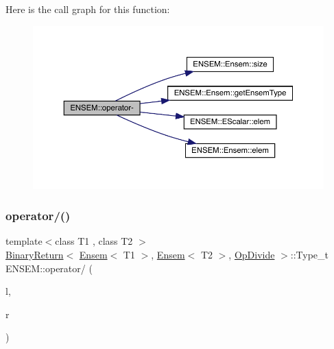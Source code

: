 Here is the call graph for this function\+:\nopagebreak
\begin{figure}[H]
\begin{center}
\leavevmode
\includegraphics[width=350pt]{d1/d9e/group__eensem_ga800941462d54db3919bdb1fe8cd1c1b6_cgraph}
\end{center}
\end{figure}
\mbox{\label{group__eensem_ga4294d59488c65a0e8cb9e552578bfd86}} 
\subsubsection{\texorpdfstring{operator/()}{operator/()}\hspace{0.1cm}{\footnotesize\ttfamily [1/3]}}
{\footnotesize\ttfamily template$<$class T1 , class T2 $>$ \\
\mbox{\hyperlink{structENSEM_1_1BinaryReturn}{Binary\+Return}}$<$ \mbox{\hyperlink{classENSEM_1_1Ensem}{Ensem}}$<$ T1 $>$, \mbox{\hyperlink{classENSEM_1_1Ensem}{Ensem}}$<$ T2 $>$, \mbox{\hyperlink{structENSEM_1_1OpDivide}{Op\+Divide}} $>$\+::Type\+\_\+t E\+N\+S\+E\+M\+::operator/ (\begin{DoxyParamCaption}\item[{const \mbox{\hyperlink{classENSEM_1_1Ensem}{Ensem}}$<$ T1 $>$ \&}]{l,  }\item[{const \mbox{\hyperlink{classENSEM_1_1Ensem}{Ensem}}$<$ T2 $>$ \&}]{r }\end{DoxyParamCaption})\hspace{0.3cm}{\ttfamily [inline]}}

